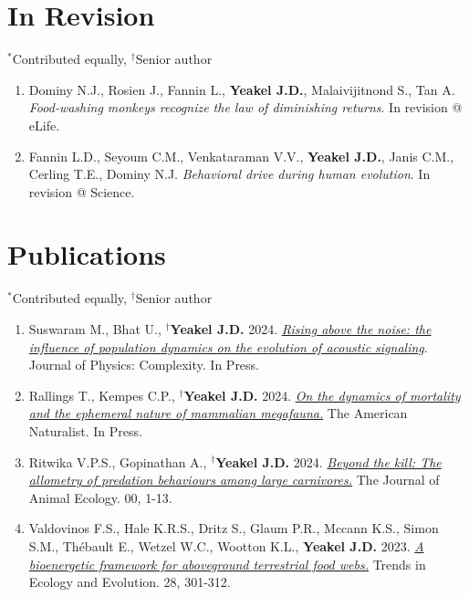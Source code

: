 \documentclass[margin,line,12pt]{res}
\newcommand\reverselabel[1]{%
  \def\theenumi{}%
  \renewcommand\makelabel{\makebox[\dimexpr\labelwidth-3pt\relax][r]{%
    \the\numexpr#1-\value{enumi}+1\relax}}}%
\begin{document}
\begin{resume}

\section{\sc In Revision}
{\footnotesize{${}^\ast$Contributed equally, ${}^\dag$Senior author}}
\begin{enumerate}
  \reverselabel{43}
\item Dominy N.J., Rosien J., Fannin L., \textbf{Yeakel J.D.}, Malaivijitnond S., Tan A. \emph{Food-washing monkeys recognize the law of diminishing returns}. In revision @ eLife.
\item Fannin L.D., Seyoum C.M., Venkataraman V.V., \textbf{Yeakel J.D.}, Janis C.M., Cerling T.E., Dominy N.J. \emph{Behavioral drive during human evolution}. In revision @ Science.
\end{enumerate}


\section{\sc Publications}
{\footnotesize{${}^\ast$Contributed equally, ${}^\dag$Senior author}}
\begin{enumerate}
  \reverselabel{41}

\item Suswaram M., Bhat U., \textbf{${}^\dag$Yeakel J.D.} 2024. \href{https://iopscience.iop.org/article/10.1088/2632-072X/ad5e2e}{\emph{Rising above the noise: the influence of population dynamics on the evolution of acoustic signaling}}. Journal of Physics: Complexity. In Press.

\item Rallings T., Kempes C.P., \textbf{${}^\dag$Yeakel J.D.} 2024. \href{https://www.journals.uchicago.edu/doi/abs/10.1086/731331}{\emph{On the dynamics of mortality and the ephemeral nature of mammalian megafauna.}} The American Naturalist. In Press.

\item Ritwika V.P.S., Gopinathan A., \textbf{${}^\dag$Yeakel J.D.} 2024. \href{https://besjournals.onlinelibrary.wiley.com/doi/10.1111/1365-2656.14070}{\emph{Beyond the kill: The allometry of predation behaviours among large carnivores.}} The Journal of Animal Ecology. 00, 1-13.

\item Valdovinos F.S., Hale K.R.S., Dritz S., Glaum P.R., Mccann K.S., Simon S.M., Thébault E., Wetzel W.C., Wootton K.L.,  \textbf{Yeakel J.D.} 2023. \href{https://www.sciencedirect.com/science/article/pii/S0169534722002841}{\emph{A bioenergetic framework for aboveground terrestrial food webs.}} Trends in Ecology and Evolution. 28, 301-312.


\end{enumerate}
\end{resume}
\end{document}
